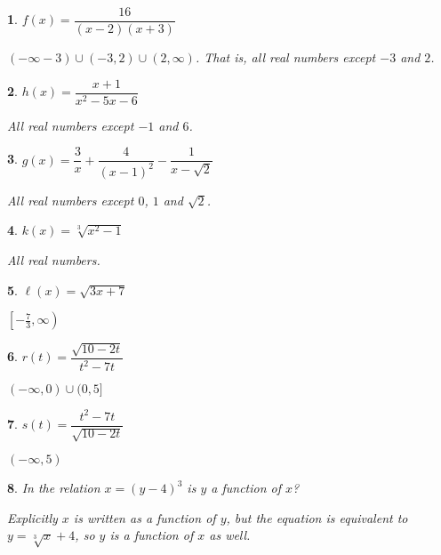 \documentclass{amsbook}
\newtheorem{exc}{}
\newenvironment{ex}{\begin{exc}\normalfont}{\end{exc}}
\numberwithin{section}{chapter}
\numberwithin{equation}{chapter}
\begin{document}
\begin{multicols}{2}
	\begin{ex}
		$f(x) = \dfrac{16}{(x-2)(x+3)}$
		\begin{sol}
			$(-\infty-3)\cup(-3, 2)\cup (2, \infty) $. That is, all real numbers except $-3$ and $2$.
		\end{sol}
	\end{ex}
	\begin{ex}
	$h(x) = \dfrac{x+1}{x^2-5x-6}$
	\begin{sol}
		All real numbers except $-1$ and $6$.
	\end{sol}
\end{ex}
	\begin{ex}
	$g(x) = \dfrac{3}{x}+\dfrac{4}{(x-1)^2} - \dfrac{1}{x-\sqrt{2}}$
	\begin{sol}
		All real numbers except $0$, $1$ and $\sqrt{2}$.
	\end{sol}
\end{ex}

	\begin{ex}
		$k(x) = \sqrt[3]{x^2-1}$
	\begin{sol}
		All real numbers.
	\end{sol}
\end{ex}
	\begin{ex}
		$\ell(x) = \sqrt{3x+7}$
	\begin{sol}
		$\left[ -\frac{7}{3}, \infty \right) $
	\end{sol}
\end{ex}
	\begin{ex}
	$r(t) = \dfrac{\sqrt{10-2t}}{t^2-7t}$
	\begin{sol}
		$(-\infty, 0)\cup(0, 5]$
	\end{sol}
\end{ex}
	\begin{ex}
	$s(t) = \dfrac{t^2-7t}{\sqrt{10-2t}}$
	\begin{sol}
		$(-\infty, 5)$
	\end{sol}
\end{ex}
\end{multicols}

	\begin{ex} \label{oneToone}
	In the relation $x = (y-4)^3$ is  $y$ a function of $x$?
	\begin{sol}
		Explicitly $x$ is written as a function of $y$, but the equation is equivalent to $y = \sqrt[3]{x}+4$, so $y$ is a function of $x$ as well.
	\end{sol}
\end{ex}
\begin{comment}
\begin{ex}
	In \#\ref{oneToone} we saw a relation where both $y$ was a function of $x$ and $x$ was a function of $y$. Sometimes such functions are called one-to-one\index{one-to-one} as each $y$ corresponds to only one $x$ (generally, functions can have multiple $x$ values for the same $y$). Is the function $y=x^2-9$ one-to-one?
	\begin{sol}
		No as $x$ is not a function of $y$.
	\end{sol}
\end{ex}
\end{comment}
\end{document}
